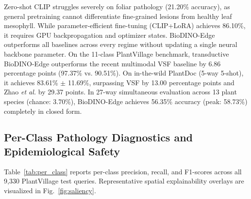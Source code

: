 \documentclass[a4paper,fleqn,nologo]{cas-dc}
\begin{document}
Zero-shot CLIP struggles severely on foliar pathology (21.20\% accuracy), as general pretraining cannot differentiate fine-grained lesions from healthy leaf mesophyll. While parameter-efficient fine-tuning (CLIP+LoRA) achieves 86.10\%, it requires GPU backpropagation and optimizer states. BioDINO-Edge outperforms all baselines across every regime without updating a single neural backbone parameter. On the 11-class PlantVillage benchmark, transductive BioDINO-Edge outperforms the recent multimodal VSF baseline \cite{zhou2026vsf} by 6.86 percentage points (97.37\% vs. 90.51\%). On in-the-wild PlantDoc (5-way 5-shot), it achieves 83.61\% $\pm$ 11.69\%, surpassing VSF by 13.00 percentage points and Zhao \textit{et al.} \cite{zhao2026lightweight} by 29.37 points. In 27-way simultaneous evaluation across 13 plant species (chance: 3.70\%), BioDINO-Edge achieves 56.35\% accuracy (peak: 58.73\%) completely in closed form.

\subsection{Per-Class Pathology Diagnostics and Epidemiological Safety}
\label{sec:per_class}
Table~\ref{tab:per_class} reports per-class precision, recall, and F1-scores across all 9,330 PlantVillage test queries. Representative spatial explainability overlays are visualized in Fig.~\ref{fig:saliency}.
\end{document}

